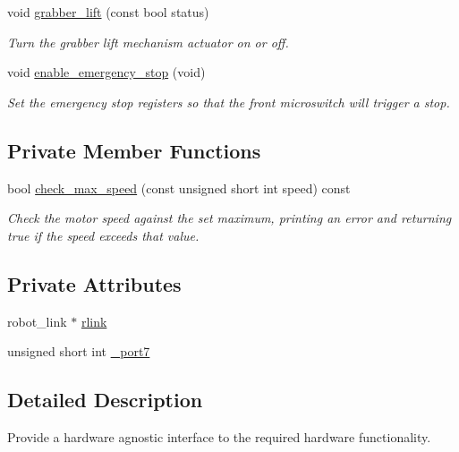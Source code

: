 \begin{DoxyCompactItemize}
void \hyperlink{classIDP_1_1HardwareAbstractionLayer_a0f036b16f1f55a257c2b552035d2a1a9}{grabber\_\-lift} (const bool status)
\begin{DoxyCompactList}\small\item\em Turn the grabber lift mechanism actuator on or off. \item\end{DoxyCompactList}\item 
void \hyperlink{classIDP_1_1HardwareAbstractionLayer_ad50b39b58566064c5bb5b0500f2d750e}{enable\_\-emergency\_\-stop} (void)
\begin{DoxyCompactList}\small\item\em Set the emergency stop registers so that the front microswitch will trigger a stop. \item\end{DoxyCompactList}\end{DoxyCompactItemize}
\subsection*{Private Member Functions}
\begin{DoxyCompactItemize}
\item 
bool \hyperlink{classIDP_1_1HardwareAbstractionLayer_a965df71af228cf82465e4e9ef6a6e1b0}{check\_\-max\_\-speed} (const unsigned short int speed) const 
\begin{DoxyCompactList}\small\item\em Check the motor speed against the set maximum, printing an error and returning true if the speed exceeds that value. \item\end{DoxyCompactList}\end{DoxyCompactItemize}
\subsection*{Private Attributes}
\begin{DoxyCompactItemize}
\item 
robot\_\-link $\ast$ \hyperlink{classIDP_1_1HardwareAbstractionLayer_a1a363a3cab8fe7fa099b19395335c0ba}{rlink}
\item 
unsigned short int \hyperlink{classIDP_1_1HardwareAbstractionLayer_a89e089becb312ef6ffe0fbc18f409b99}{\_\-port7}
\end{DoxyCompactItemize}


\subsection{Detailed Description}
Provide a hardware agnostic interface to the required hardware functionality. 

